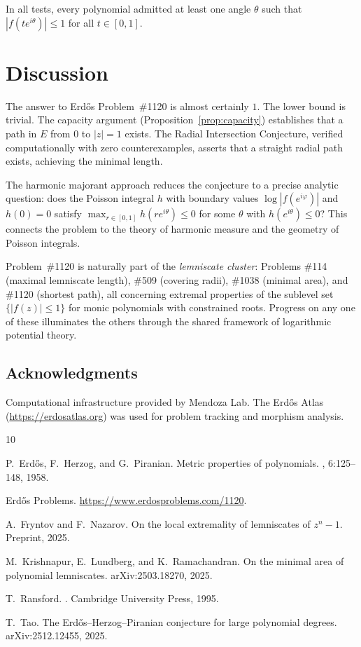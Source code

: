\documentclass[11pt]{article}
\theoremstyle{definition}
\theoremstyle{remark}
\begin{document}
In all tests, every polynomial admitted at least one angle $\theta$ such that $|f(te^{i\theta})|\leq 1$ for all $t\in[0,1]$.

\section{Discussion}

The answer to Erd\H{o}s Problem~\#1120 is almost certainly $1$. The lower bound is trivial. The capacity argument (Proposition~\ref{prop:capacity}) establishes that a path in $E$ from $0$ to $|z|=1$ exists. The Radial Intersection Conjecture, verified computationally with zero counterexamples, asserts that a straight radial path exists, achieving the minimal length.

The harmonic majorant approach reduces the conjecture to a precise analytic question: does the Poisson integral $h$ with boundary values $\log|f(e^{i\varphi})|$ and $h(0)=0$ satisfy $\max_{r\in[0,1]}h(re^{i\theta})\leq 0$ for some $\theta$ with $h(e^{i\theta})\leq 0$? This connects the problem to the theory of harmonic measure and the geometry of Poisson integrals.

Problem~\#1120 is naturally part of the \emph{lemniscate cluster}: Problems \#114 (maximal lemniscate length), \#509 (covering radii), \#1038 (minimal area), and \#1120 (shortest path), all concerning extremal properties of the sublevel set $\{|f(z)|\leq 1\}$ for monic polynomials with constrained roots. Progress on any one of these illuminates the others through the shared framework of logarithmic potential theory.

\subsection*{Acknowledgments}
Computational infrastructure provided by Mendoza Lab. The Erd\H{o}s Atlas (\url{https://erdosatlas.org}) was used for problem tracking and morphism analysis.

\begin{thebibliography}{10}

P.~Erd\H{o}s, F.~Herzog, and G.~Piranian.
\newblock Metric properties of polynomials.
, 6:125--148, 1958.

Erd\H{o}s Problems.
\newblock \url{https://www.erdosproblems.com/1120}.

A.~Fryntov and F.~Nazarov.
\newblock On the local extremality of lemniscates of $z^n-1$.
\newblock Preprint, 2025.

M.~Krishnapur, E.~Lundberg, and K.~Ramachandran.
\newblock On the minimal area of polynomial lemniscates.
\newblock arXiv:2503.18270, 2025.

T.~Ransford.
.
\newblock Cambridge University Press, 1995.

T.~Tao.
\newblock The Erd\H{o}s--Herzog--Piranian conjecture for large polynomial degrees.
\newblock arXiv:2512.12455, 2025.

\end{thebibliography}
\end{document}
